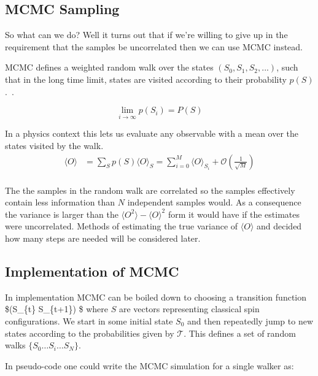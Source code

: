 \hypertarget{mcmc-sampling}{%
\subsection{MCMC Sampling}\label{mcmc-sampling}}

So what can we do? Well it turns out that if we're willing to give up in the requirement that the samples be uncorrelated then we can use MCMC instead.

MCMC defines a weighted random walk over the states \((S_0, S_1, S_2, ...)\), such that in the long time limit, states are visited according to their probability \(p(S)\).~\autocite{binderGuidePracticalWork1988,kerteszAdvancesComputerSimulation1998,wolffMonteCarloErrors2004}. ~\autocite{krauthIntroductionMonteCarlo1998}

\[\lim_{i\to\infty} p(S_i) = P(S)\]

In a physics context this lets us evaluate any observable with a mean over the states visited by the walk. \[\begin{aligned}
\langle O \rangle & = \sum_{S} p(S) \langle O \rangle_{S} = \sum_{i = 0}^{M} \langle O\rangle_{S_i} + \mathcal{O}(\tfrac{1}{\sqrt{M}})\\
\end{aligned}\]

The the samples in the random walk are correlated so the samples effectively contain less information than \(N\) independent samples would. As a consequence the variance is larger than the \(\langle O^2 \rangle - \langle O\rangle^2\) form it would have if the estimates were uncorrelated. Methods of estimating the true variance of \(\langle O \rangle\) and decided how many steps are needed will be considered later.

\hypertarget{implementation-of-mcmc}{%
\subsection{Implementation of MCMC}\label{implementation-of-mcmc}}

In implementation MCMC can be boiled down to choosing a transition function \$(S\_\{t\} \rightarrow S\_\{t+1\}) \$ where \(S\) are vectors representing classical spin configurations. We start in some initial state \(S_0\) and then repeatedly jump to new states according to the probabilities given by \(\mathcal{T}\). This defines a set of random walks \(\{S_0\ldots S_i\ldots S_N\}\).

In pseudo-code one could write the MCMC simulation for a single walker as:

